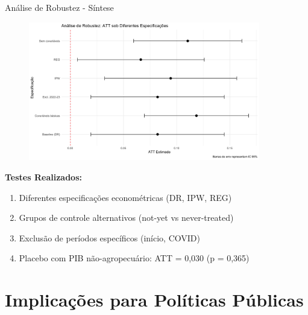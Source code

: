 \documentclass[10pt,aspectratio=169]{beamer}
\begin{document}
\begin{frame}{Análise de Robustez - Síntese}
\begin{figure}
\centering
\includegraphics[width=0.9\textwidth]{../../../data/outputs/robustness_plot.png}
\end{figure}

\textbf{Testes Realizados:}
\begin{enumerate}
    \item Diferentes especificações econométricas (DR, IPW, REG)
    \item Grupos de controle alternativos (not-yet vs never-treated)
    \item Exclusão de períodos específicos (início, COVID)
    \item Placebo com PIB não-agropecuário: ATT = 0,030 (p = 0,365)
\end{enumerate}
\end{frame}

\section{Implicações para Políticas Públicas}
\end{document}

